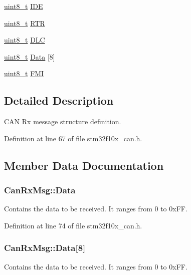 \begin{DoxyCompactItemize}
\item 
\hyperlink{_p_e___types_8h_aba7bc1797add20fe3efdf37ced1182c5}{uint8\+\_\+t} \hyperlink{struct_can_rx_msg_a83a67d1a709cc01570ce956e5adc811f}{I\+DE}
\item 
\hyperlink{_p_e___types_8h_aba7bc1797add20fe3efdf37ced1182c5}{uint8\+\_\+t} \hyperlink{struct_can_rx_msg_a9a183149a391a24f86da2ce895f0f1c9}{R\+TR}
\item 
\hyperlink{_p_e___types_8h_aba7bc1797add20fe3efdf37ced1182c5}{uint8\+\_\+t} \hyperlink{struct_can_rx_msg_abf77d3abf9ad290c08cdfd5d99ebc745}{D\+LC}
\item 
\hyperlink{_p_e___types_8h_aba7bc1797add20fe3efdf37ced1182c5}{uint8\+\_\+t} \hyperlink{struct_can_rx_msg_ae8ecbad16622db30d63fda08bc478649}{Data} \mbox{[}8\mbox{]}
\item 
\hyperlink{_p_e___types_8h_aba7bc1797add20fe3efdf37ced1182c5}{uint8\+\_\+t} \hyperlink{struct_can_rx_msg_a5afe39d8e295659eeb3030593828b96a}{F\+MI}
\end{DoxyCompactItemize}


\subsection{Detailed Description}
C\+AN Rx message structure definition. 

Definition at line 67 of file stm32f10x\+\_\+can.\+h.



\subsection{Member Data Documentation}
\subsubsection[{\texorpdfstring{Data}{Data}}]{ Can\+Rx\+Msg\+::\+Data}\hypertarget{struct_can_rx_msg_a874252ee64abf660f9165b25773c2ada}{}\label{struct_can_rx_msg_a874252ee64abf660f9165b25773c2ada}
Contains the data to be received. It ranges from 0 to 0x\+FF. 

Definition at line 74 of file stm32f10x\+\_\+can.\+h.

\subsubsection[{\texorpdfstring{Data}{Data}}]{ Can\+Rx\+Msg\+::\+Data\mbox{[}8\mbox{]}}\hypertarget{struct_can_rx_msg_ae8ecbad16622db30d63fda08bc478649}{}\label{struct_can_rx_msg_ae8ecbad16622db30d63fda08bc478649}
Contains the data to be received. It ranges from 0 to 0x\+FF. 

